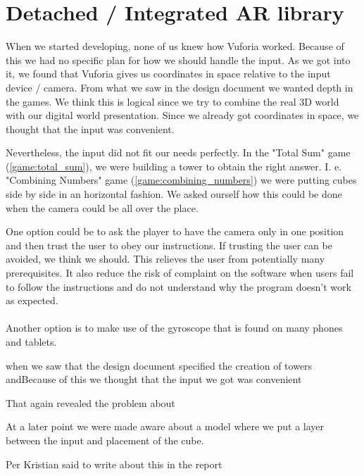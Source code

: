 \section{Detached / Integrated AR library}
\label{sect:input_handling}
When we started developing, none of us knew how Vuforia worked. Because of this
we had no specific plan for how we should handle the input. As we got into it,
we found that Vuforia gives us coordinates in space relative to the input
device / camera. From what we saw in the design document we wanted depth in the
games. We think this is logical since we try to combine the real 3D world with
our digital world presentation. Since we already got coordinates in space, we
thought that the input was convenient.

Nevertheless, the input did not fit our needs perfectly. In the "Total Sum"
game (\ref{game:total_sum}), we were building a tower to obtain the right
answer. I. e. "Combining Numbers" game (\ref{game:combining_numbers}) we were
putting cubes side by side in an horizontal fashion. We asked ourself how this
could be done when the camera could be all over the place.

One option could be to ask the player to have the camera only in one position
and then trust the user to obey our instructions. If trusting the user can be
avoided, we think we should. This relieves the user from potentially many
prerequisites. It also reduce the risk of complaint on the software when users
fail to follow the instructions and do not understand why the program doesn't
work as expected.

\paragraph{}

Another option is to make use of the gyroscope that is found on many phones
and tablets.

when we saw that the design document specified the creation of towers andBecause of this we thought that the input we
got was convenient

That again revealed the problem about


At a later point we were made aware about a model where we put a layer between 
the input and placement of the cube. 

Per Kristian said to write about this in the report

